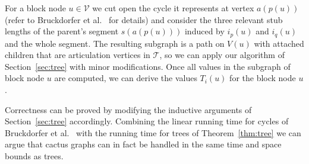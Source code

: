 \documentclass[a4paper,english,numberwithinsect]{eurocg18}
\newcommand{\maxsped}{\ensuremath{\textsc{MaxSPED}}\xspace}
\begin{document}
For a block node $ u \in \mathcal V $ we cut open the cycle it represents at vertex $a(p(u))$ (refer to Bruckdorfer et al.~\cite{bcgkmn-pped-17} for details) and consider the three relevant stub lengths of the parent's segment $s(a(p(u)))$ induced by $i_p(u)$ and $i_q(u)$ and the whole segment. 
The resulting subgraph is a path on $V(u)$ with attached children that are articulation vertices in $\mathcal T$, so we can apply our algorithm of Section~\ref{sec:tree} with minor modifications.
Once all values in the subgraph of block node $u$ are computed, we can derive the values $T_i(u)$ for the block node $u$.


Correctness can be proved by modifying the inductive arguments of Section~\ref{sec:tree} accordingly. 
Combining the linear running time for cycles of Bruckdorfer et al.~\cite{bcgkmn-pped-17} with the running time for trees of Theorem~\ref{thm:tree} we can argue that cactus graphs can in fact be handled in the same time and space bounds as trees.

\end{document}
